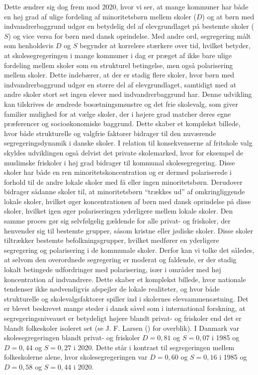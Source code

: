 \documentclass[
]{book}
\begin{document}
Dette ændrer sig dog frem mod 2020, hvor vi ser, at mange kommuner har både en høj grad af ulige fordeling af minoritetsbørn mellem skoler (\(D\)) og at børn med indvandrerbaggrund udgør en betydelig del af elevgrundlaget på bestemte skoler (\(S\)) og vice versa for børn med dansk oprindelse. Med andre ord, segregering målt som henholdsvis \(D\) og \(S\) begynder at korrelere stærkere over tid, hvilket betyder, at skolesegregeringen i mange kommuner i dag er præget af ikke bare ulige fordeling mellem skoler som en strukturel betingelse, men også polarisering mellem skoler. Dette indebærer, at der er stadig flere skoler, hvor børn med indvandrerbaggrund udgør en større del af elevgrundlaget, samtidigt med at andre skoler stort set ingen elever med indvandrerbaggrund har. Denne udvikling kan tilskrives de ændrede bosætningsmønstre og det frie skolevalg, som giver familier mulighed for at vælge skoler, der i højere grad matcher deres egne præferencer og socioøkonomiske baggrund. Dette skaber et komplekst billede, hvor både strukturelle og valgfrie faktorer bidrager til den nuværende segregeringsdynamik i danske skoler. I relation til konsekvenserne af fritskole valg skyldes udviklingen også delvist det private skolemarked, hvor for eksempel de muslimske friskoler i høj grad bidrager til kommunal skolesegregering. Disse skoler har både en ren minoritetskoncentration og er dermed polariserede i forhold til de andre lokale skoler med få eller ingen minoritetsbørn. Derudover bidrager sådanne skoler til, at minoritetsbørn ``trækkes ud'' af omkringliggende lokale skoler, hvilket øger koncentrationen af børn med dansk oprindelse på disse skoler, hvilket igen øger polariseringen yderligere mellem lokale skoler. Den samme proces gør sig selvfølgelig gældende for alle privat- og friskoler, der henvender sig til bestemte grupper, såsom kristne eller jødiske skoler. Disse skoler tiltrækker bestemte befolkningsgrupper, hvilket medfører en yderligere segregering og polarisering i de kommunale skoler. Derfor kan vi tolke det således, at selvom den overordnede segregering er moderat og faldende, er der stadig lokalt betingede udfordringer med polarisering, især i områder med høj koncentration af indvandrere. Dette skaber et komplekst billede, hvor nationale tendenser ikke nødvendigvis afspejler de lokale realiteter, og hvor både strukturelle og skolevalgsfaktorer spiller ind i skolernes elevsammensætning.
Det er blevet beskrevet mange steder i dansk såvel som i international forskning, at segregeringsniveauet er betydeligt højere blandt privat- og friskoler end det er blandt folkeskoler isoleret set (se J. F. Larsen () for overblik). I Danmark var skolesegregeringen blandt privat- og friskoler \(D=0,81\) og \(S=0,07\) i 1985 og \(D=0,44\) og \(S=0,27\) i 2020. Dette står i kontrast til segregeringen mellem folkeskolerne alene, hvor skolesegregeringen var \(D=0,60\) og \(S=0,16\) i 1985 og \(D=0,58\) og \(S=0,44\) i 2020.
\end{document}
